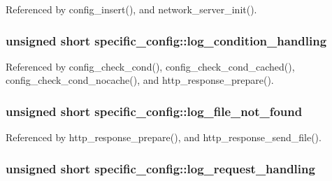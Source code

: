Referenced by config\-\_\-insert(), and network\-\_\-server\-\_\-init().

\hypertarget{structspecific__config_a9ae966c3ccc5492229e8bfe7d84994a9}{
\subsubsection[{log\-\_\-condition\-\_\-handling}]{\setlength{\rightskip}{0pt plus 5cm}unsigned short specific\-\_\-config\-::log\-\_\-condition\-\_\-handling}}\label{structspecific__config_a9ae966c3ccc5492229e8bfe7d84994a9}


Referenced by config\-\_\-check\-\_\-cond(), config\-\_\-check\-\_\-cond\-\_\-cached(), config\-\_\-check\-\_\-cond\-\_\-nocache(), and http\-\_\-response\-\_\-prepare().

\hypertarget{structspecific__config_a595ea0cae2257c2f62763537b1403ef7}{
\subsubsection[{log\-\_\-file\-\_\-not\-\_\-found}]{\setlength{\rightskip}{0pt plus 5cm}unsigned short specific\-\_\-config\-::log\-\_\-file\-\_\-not\-\_\-found}}\label{structspecific__config_a595ea0cae2257c2f62763537b1403ef7}


Referenced by http\-\_\-response\-\_\-prepare(), and http\-\_\-response\-\_\-send\-\_\-file().

\hypertarget{structspecific__config_ac2386ab65ca730b15dfa3fde14093d2a}{
\subsubsection[{log\-\_\-request\-\_\-handling}]{\setlength{\rightskip}{0pt plus 5cm}unsigned short specific\-\_\-config\-::log\-\_\-request\-\_\-handling}}\label{structspecific__config_ac2386ab65ca730b15dfa3fde14093d2a}


